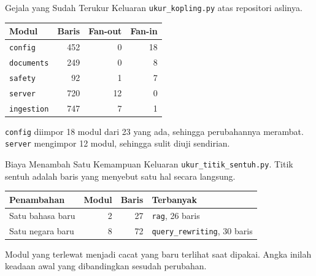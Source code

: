 \documentclass[aspectratio=169, table, 12pt]{beamer}
\begin{document}
\begin{frame}{{\Large Gejala yang Sudah Terukur}}
  \vspace{6pt}
  {\small Keluaran \texttt{ukur\_kopling.py} atas repositori aslinya.}

  \vspace{6pt}
  \centering
  \small
  \begin{tabularx}{0.9\textwidth}{|l|r|r|r|}
    \hline
    \textbf{Modul} & \textbf{Baris} & \textbf{Fan-out} & \textbf{Fan-in} \\
    \hline
    \texttt{config} & 452 & 0 & 18 \\
    \hline
    \texttt{documents} & 249 & 0 & 8 \\
    \hline
    \texttt{safety} & 92 & 1 & 7 \\
    \hline
    \texttt{server} & 720 & 12 & 0 \\
    \hline
    \texttt{ingestion} & 747 & 7 & 1 \\
    \hline
  \end{tabularx}

  \vspace{6pt}
  \raggedright
  {\small \texttt{config} diimpor 18 modul dari 23 yang ada, sehingga
  perubahannya merambat. \texttt{server} mengimpor 12 modul, sehingga sulit
  diuji sendirian.}
\end{frame}

\begin{frame}{{\Large Biaya Menambah Satu Kemampuan}}
  \vspace{6pt}
  {\small Keluaran \texttt{ukur\_titik\_sentuh.py}. Titik sentuh adalah baris
  yang menyebut satu hal secara langsung.}

  \vspace{6pt}
  \centering
  \small
  \begin{tabularx}{0.9\textwidth}{|X|r|r|X|}
    \hline
    \textbf{Penambahan} & \textbf{Modul} & \textbf{Baris} & \textbf{Terbanyak} \\
    \hline
    Satu bahasa baru & 2 & 27 & \texttt{rag}, 26 baris \\
    \hline
    Satu negara baru & 8 & 72 & \texttt{query\_rewriting}, 30 baris \\
    \hline
  \end{tabularx}

  \vspace{6pt}
  \raggedright
  {\small Modul yang terlewat menjadi cacat yang baru terlihat saat dipakai.
  Angka inilah keadaan awal yang dibandingkan sesudah perubahan.}
\end{frame}
\end{document}
